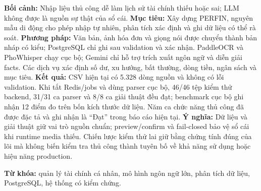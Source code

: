 
\textbf{Bối cảnh:} Nhập liệu thủ công dễ làm lịch sử tài chính thiếu hoặc sai; LLM không được là nguồn sự thật của sổ cái. \textbf{Mục tiêu:} Xây dựng PERFIN, nguyên mẫu di động cho phép nhập tự nhiên, phân tích xác định và ghi dữ liệu có thể rà soát. \textbf{Phương pháp:} Văn bản, ảnh hóa đơn và giọng nói được chuyển thành bản nháp có kiểu; PostgreSQL chỉ ghi sau validation và xác nhận. PaddleOCR và PhoWhisper chạy cục bộ; Gemini chỉ hỗ trợ trích xuất ngôn ngữ và diễn giải facts. Các dịch vụ xác định số dư, xu hướng, bất thường, dòng tiền, ngân sách và mục tiêu. \textbf{Kết quả:} CSV hiện tại có 5.328 dòng nguồn và không có lỗi validation. Khi tắt Redis/jobs và dùng parser cục bộ, 46/46 tệp kiểm thử backend, 31/31 ca parser và 8/8 ca giải thuật đều đạt; benchmark cục bộ ghi nhận 12 điểm đo trên bốn kích thước dữ liệu. Năm ca chức năng thủ công đã được đặc tả và ghi nhận là ``Đạt'' trong báo cáo hiện tại. \textbf{Ý nghĩa:} Dữ liệu và giải thuật giữ vai trò nguồn chuẩn; preview/confirm và fail-closed bảo vệ sổ cái khi runtime media thiếu. Chiến lược kiểm thử lai giữ bằng chứng tính đúng của lõi mà không biến kiểm tra thủ công thành tuyên bố về khả năng sử dụng hoặc hiệu năng production.

\vspace{0.5cm}
\noindent\textbf{Từ khóa:} quản lý tài chính cá nhân, mô hình ngôn ngữ lớn, phân tích dữ liệu, PostgreSQL, hệ thống có kiểm chứng.
